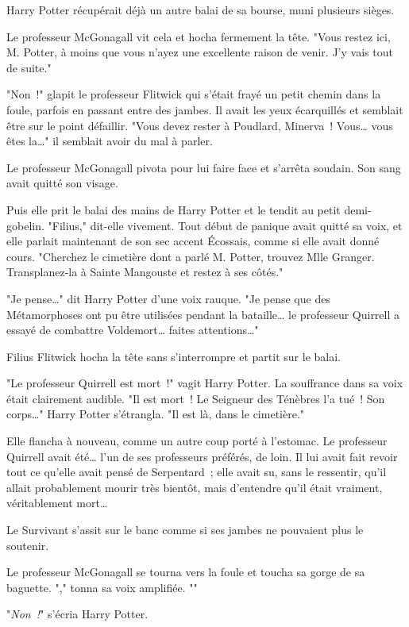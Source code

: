 Harry Potter récupérait déjà un autre balai de sa bourse, muni plusieurs sièges.

Le professeur McGonagall vit cela et hocha fermement la tête. "Vous restez ici, M. Potter, à moins que vous n'ayez une excellente raison de venir. J'y vais tout de suite."

"Non~!" glapit le professeur Flitwick qui s'était frayé un petit chemin dans la foule, parfois en passant entre des jambes. Il avait les yeux écarquillés et semblait être sur le point défaillir. "Vous devez rester à Poudlard, Minerva~! Vous… vous êtes la…" il semblait avoir du mal à parler.

Le professeur McGonagall pivota pour lui faire face et s'arrêta soudain. Son sang avait quitté son visage.

Puis elle prit le balai des mains de Harry Potter et le tendit au petit demi-gobelin. "Filius," dit-elle vivement. Tout début de panique avait quitté sa voix, et elle parlait maintenant de son sec accent Écossais, comme si elle avait donné cours. "Cherchez le cimetière dont a parlé M. Potter, trouvez Mlle Granger. Transplanez-la à Sainte Mangouste et restez à ses côtés."

"Je pense…" dit Harry Potter d'une voix rauque. "Je pense que des Métamorphoses ont pu être utilisées pendant la bataille… le professeur Quirrell a essayé de combattre Voldemort… faites attentions…"

Filius Flitwick hocha la tête sans s'interrompre et partit sur le balai.

"Le professeur Quirrell est mort~!" vagit Harry Potter. La souffrance dans sa voix était clairement audible. "Il est mort~! Le Seigneur des Ténèbres l'a tué~! Son corps…" Harry Potter s'étrangla. "Il est là, dans le cimetière."

Elle flancha à nouveau, comme un autre coup porté à l'estomac. Le professeur Quirrell avait été… l'un de ses professeurs préférés, de loin. Il lui avait fait revoir tout ce qu'elle avait pensé de Serpentard~; elle avait su, sans le ressentir, qu'il allait probablement mourir très bientôt, mais d'entendre qu'il était vraiment, véritablement mort…

Le Survivant s'assit sur le banc comme si ses jambes ne pouvaient plus le soutenir.

Le professeur McGonagall se tourna vers la foule et toucha sa gorge de sa baguette. "," tonna sa voix amplifiée. ""

"\emph{Non~!}" s'écria Harry Potter.

